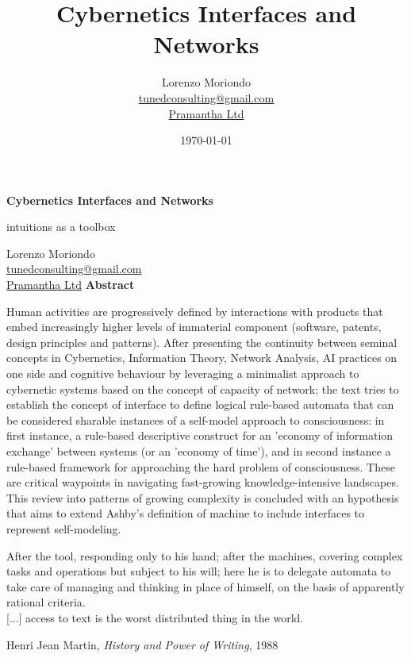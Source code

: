 \documentclass[14pt]{extarticle}
\title{Cybernetics Interfaces and Networks}%
\author{Lorenzo Moriondo \\ \href{mailto:tunedconsulting@gmail.com}{tunedconsulting@gmail.com} \\ \href{https://pramantha.net}{Pramantha Ltd}}%
\date{\today}%
\begin{document}
%

\begin{titlepage}
	\begin{center}
    	\vspace*{1cm}
        \Huge
        \textbf{Cybernetics Interfaces and Networks}%

        \vspace{0.5cm}
        \LARGE{intuitions as a toolbox}
            
        \vspace{1.5cm}

        \normalsize{Lorenzo Moriondo \\ \href{mailto:tunedconsulting@gmail.com}{tunedconsulting@gmail.com} \\ \href{https://pramantha.net}{Pramantha Ltd}}
        \vfill
        \textbf{Abstract}
	\end{center}   
    \vspace{3mm}

	Human activities are progressively defined by interactions with products that embed increasingly higher levels of immaterial component (software, patents, design principles and patterns). After presenting the continuity between seminal concepts in Cybernetics, Information Theory, Network Analysis, AI practices on one side and cognitive behaviour by leveraging a minimalist approach to cybernetic systems based on the concept of capacity of network; the text tries to establish the concept of interface to define logical rule-based automata that can be considered sharable instances of a self-model approach to consciousness: in first instance, a rule-based descriptive construct for an 'economy of information exchange' between systems (or an 'economy of time'), and in second instance a rule-based framework for approaching the hard problem of consciousness. These are critical waypoints in navigating fast-growing knowledge-intensive landscapes. This review into patterns of growing complexity is concluded with an hypothesis that aims to extend Ashby's definition of machine to include interfaces to represent self-modeling.
\end{titlepage}%

\newpage

\pagestyle{header}%

\epigraph{
After the tool, responding only to his hand; after the machines, covering complex tasks and operations but subject to his will; here he is to delegate automata to take care of managing and thinking in place of himself, on the basis of apparently rational criteria.\\
\vspace{5mm}
[...] access to text is the worst distributed thing in the world.
}{Henri Jean Martin, \textit{History and Power of Writing}, 1988}
\end{document}
